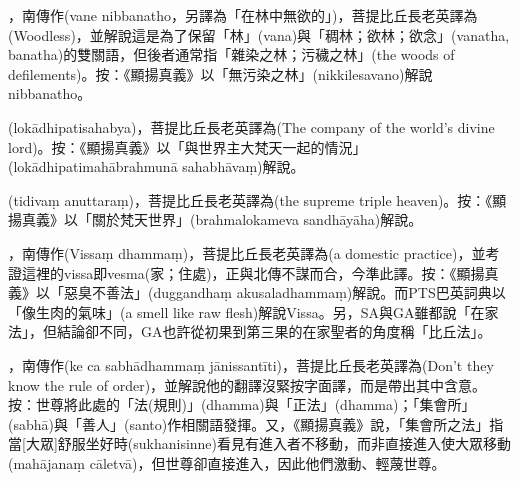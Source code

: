 \startitemgroup[noteitems]
\item{}，南傳作(vane nibbanatho，另譯為「在林中無欲的」)，菩提比丘長老英譯為(Woodless)，並解說這是為了保留「林」(vana)與「稠林；欲林；欲念」(vanatha, banatha)的雙關語，但後者通常指「雜染之林；污穢之林」(the woods of defilements)。按：《顯揚真義》以「無污染之林」(nikkilesavano)解說nibbanatho。
\stopitemgroup

\startitemgroup[noteitems]
\item{}(lokādhipatisahabya)，菩提比丘長老英譯為(The company of the world's divine lord)。按：《顯揚真義》以「與世界主大梵天一起的情況」(lokādhipatimahābrahmunā sahabhāvaṃ)解說。
\stopitemgroup

\startitemgroup[noteitems]
\item{}(tidivaṃ anuttaraṃ)，菩提比丘長老英譯為(the supreme triple heaven)。按：《顯揚真義》以「關於梵天世界」(brahmalokameva sandhāyāha)解說。
\stopitemgroup

\startitemgroup[noteitems]
\item{}，南傳作(Vissaṃ dhammaṃ)，菩提比丘長老英譯為(a domestic practice)，並考證這裡的vissa即vesma(家；住處)，正與北傳不謀而合，今準此譯。按：《顯揚真義》以「惡臭不善法」(duggandhaṃ akusaladhammaṃ)解說。而PTS巴英詞典以「像生肉的氣味」(a smell like raw flesh)解說Vissa。另，SA與GA雖都說「在家法」，但結論卻不同，GA也許從初果到第三果的在家聖者的角度稱「比丘法」。
\stopitemgroup

\startitemgroup[noteitems]
\item{}，南傳作(ke ca sabhādhammaṃ jānissantīti)，菩提比丘長老英譯為(Don't they know the rule of order)，並解說他的翻譯沒緊按字面譯，而是帶出其中含意。按：世尊將此處的「法(規則)」(dhamma)與「正法」(dhamma)；「集會所」(sabhā)與「善人」(santo)作相關語發揮。又，《顯揚真義》說，「集會所之法」指當[大眾]舒服坐好時(sukhanisinne)看見有進入者不移動，而非直接進入使大眾移動(mahājanaṃ cāletvā)，但世尊卻直接進入，因此他們激動、輕蔑世尊。
\stopitemgroup

